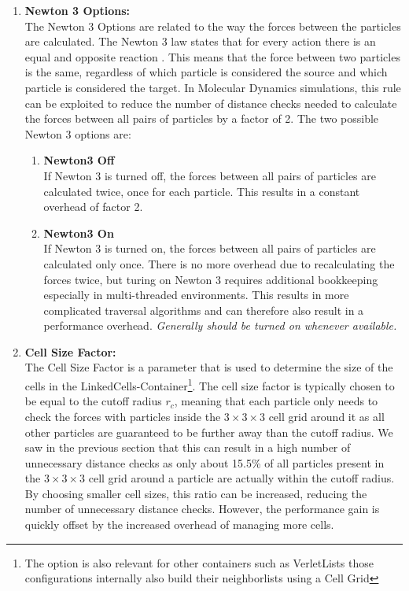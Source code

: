 \begin{enumerate}[label=\textbf{\arabic*.}]
      \item \textbf{Newton 3 Options:} \\
            The Newton 3 Options are related to the way the forces between the particles are calculated. The Newton 3 law states that for every action there is an equal and opposite reaction . This means that the force between two particles is the same, regardless of which particle is considered the source and which particle is considered the target. In Molecular Dynamics simulations, this rule can be exploited to reduce the number of distance checks needed to calculate the forces between all pairs of particles by a factor of 2. The two possible Newton 3 options are:
            \begin{enumerate}
                  \item \textbf{Newton3 Off} \\
                        If Newton 3 is turned off, the forces between all pairs of particles are calculated twice, once for each particle. This results in a constant overhead of factor 2.

                  \item \textbf{Newton3 On} \\
                        If Newton 3 is turned on, the forces between all pairs of particles are calculated only once. There is no more overhead due to recalculating the forces twice, but turing on Newton 3 requires additional bookkeeping especially in multi-threaded environments. This results in more complicated traversal algorithms and can therefore also result in a performance overhead.
                        \textit{Generally should be turned on whenever available.}
            \end{enumerate}

      \item \textbf{Cell Size Factor:} \\
            The Cell Size Factor is a parameter that is used to determine the size of the cells in the LinkedCells-Container\footnote{The option is also relevant for other containers such as VerletLists those configurations internally also build their neighborlists using a Cell Grid }. The cell size factor is typically chosen to be equal to the cutoff radius $r_c$, meaning that each particle only needs to check the forces with particles inside the $3\times3\times3$ cell grid around it as all other particles are guaranteed to be further away than the cutoff radius. We saw in the previous section that this can result in a high number of unnecessary distance checks as only about 15.5\% of all particles present in the $3\times3\times3$ cell grid around a particle are actually within the cutoff radius. By choosing smaller cell sizes, this ratio can be increased, reducing the number of unnecessary distance checks. However, the performance gain is quickly offset by the increased overhead of managing more cells. 

\end{enumerate}

